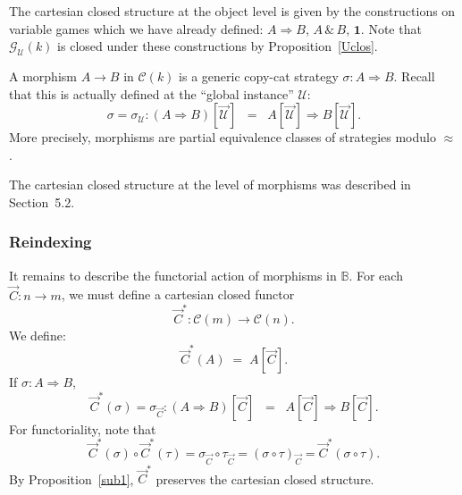 \documentclass[a4paper,11pt]{article}
\newcommand{\gequiv}{\approx}
\newcommand{\UU}{\mathcal{U}}
\newcommand{\llwith}{\, \& \,}
\newcommand{\ICC}{\mathcal{C}}
\newcommand{\GU}[1]{\mathcal{G}_{\UU}(#1)}
\newcommand{\Base}{\mathbb{B}}
\begin{document}
The cartesian closed structure at the object level is given by the
constructions on variable games which we have already defined: $A
\Rightarrow B$, $A \llwith B$, $\mathbf{1}$. Note that $\GU{k}$ is closed under these constructions by Proposition~\ref{Uclos}.

A morphism $A \longrightarrow B$ in $\ICC (k)$ is a generic copy-cat strategy
$\sigma : A \Rightarrow B$. Recall that this is actually defined at
the ``global instance'' $\UU$:
\[ \sigma = \sigma_{\UU} : (A \Rightarrow B)[\vec{\UU}] \;\; = \;\;
A[\vec{\UU}] \Rightarrow B[\vec{\UU}] . \]
More precisely, morphisms are partial equivalence classes of strategies modulo $\gequiv$.

The cartesian closed structure at the level of morphisms was
described in Section~5.2.

\subsubsection*{Reindexing}
It remains to describe the functorial action of morphisms in $\Base$. For
each $\vec{C} : n \rightarrow m$, we must define a cartesian closed
functor
\[ \vec{C}^{\ast} : \ICC (m) \longrightarrow \ICC (n) . \]
We define:
\[ \vec{C}^{\ast}(A) \; = \; A[\vec{C}] . \]
If $\sigma : A \Rightarrow B$,
\[ \vec{C}^{\ast}(\sigma ) = \sigma_{\vec{C}} : (A \Rightarrow
B)[\vec{C}] \;\; = \;\; A[\vec{C}] \Rightarrow B[\vec{C}] . \]
For functoriality, note that
\[ \vec{C}^{\ast}(\sigma ) \circ \vec{C}^{\ast}(\tau ) =
\sigma_{\vec{C}} \circ \tau_{\vec{C}} = (\sigma \circ \tau )_{\vec{C}} =
  \vec{C}^{\ast} (\sigma \circ \tau ) . \]
By Proposition~\ref{sub1}, $\vec{C}^{\ast}$ preserves the cartesian
closed structure.
\end{document}
